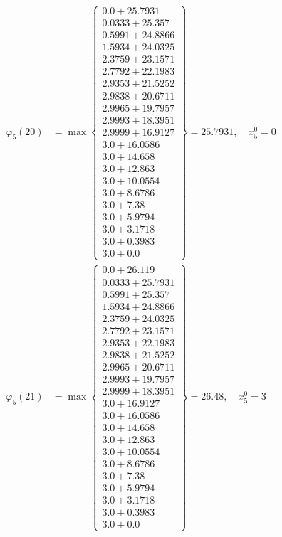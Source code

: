 \documentclass{article}
\begin{document}
\begin{align*}
\varphi_{5}(20) &= \max \left\{ \begin{array}{c}
0.0 + 25.7931 \\
 0.0333 + 25.357 \\
 0.5991 + 24.8866 \\
 1.5934 + 24.0325 \\
 2.3759 + 23.1571 \\
 2.7792 + 22.1983 \\
 2.9353 + 21.5252 \\
 2.9838 + 20.6711 \\
 2.9965 + 19.7957 \\
 2.9993 + 18.3951 \\
 2.9999 + 16.9127 \\
 3.0 + 16.0586 \\
 3.0 + 14.658 \\
 3.0 + 12.863 \\
 3.0 + 10.0554 \\
 3.0 + 8.6786 \\
 3.0 + 7.38 \\
 3.0 + 5.9794 \\
 3.0 + 3.1718 \\
 3.0 + 0.3983 \\
 3.0 + 0.0
\end{array} \right\}=25.7931, \quad x_{5}^0=0\\
  
\varphi_{5}(21) &= \max \left\{ \begin{array}{c}
0.0 + 26.119 \\
 0.0333 + 25.7931 \\
 0.5991 + 25.357 \\
 1.5934 + 24.8866 \\
 2.3759 + 24.0325 \\
 2.7792 + 23.1571 \\
 2.9353 + 22.1983 \\
 2.9838 + 21.5252 \\
 2.9965 + 20.6711 \\
 2.9993 + 19.7957 \\
 2.9999 + 18.3951 \\
 3.0 + 16.9127 \\
 3.0 + 16.0586 \\
 3.0 + 14.658 \\
 3.0 + 12.863 \\
 3.0 + 10.0554 \\
 3.0 + 8.6786 \\
 3.0 + 7.38 \\
 3.0 + 5.9794 \\
 3.0 + 3.1718 \\
 3.0 + 0.3983 \\
 3.0 + 0.0
\end{array} \right\}=26.48, \quad x_{5}^0=3\\
  

\end{align*}
\end{document}
